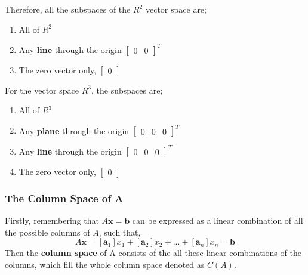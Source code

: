             \par \hfill \break
            Therefore, all the subspaces of the \(R^2\) vector space are;
            \begin{enumerate}
                \item All of \(R^2\)
                \item Any \textbf{line} through the origin \(\begin{bmatrix} 0 & 0 \end{bmatrix}^T\)
                \item The zero vector only, \(\begin{bmatrix} 0 \end{bmatrix}\)
            \end{enumerate}
            For the vector space \(R^3\), the subspaces are;
            \begin{enumerate}
                \item All of \(R^3\)
                \item Any \textbf{plane} through the origin \(\begin{bmatrix} 0 & 0 & 0 \end{bmatrix}^T\)
                \item Any \textbf{line} through the origin \(\begin{bmatrix} 0 & 0 & 0\end{bmatrix}^T\)
                \item The zero vector only, \(\begin{bmatrix} 0 \end{bmatrix}\)
            \end{enumerate}
        
        \subsubsection{The Column Space of \(\boldsymbol{A}\)}
            Firstly, remembering that \(A\boldsymbol{x}=\boldsymbol{b}\) can be expressed as a linear combination of
            all the possible columns of \(A\), such that,
            \begin{equation}
                A\boldsymbol{x} = [\boldsymbol{a}_1]x_1 +
                [\boldsymbol{a}_2]x_2 + ... + [\boldsymbol{a}_n]x_n
                = \boldsymbol{b}
            \end{equation}
            Then the \textbf{column space} of A consists of the all these linear combinations of the columns, which 
            fill the whole column space denoted as \(C(A)\).


